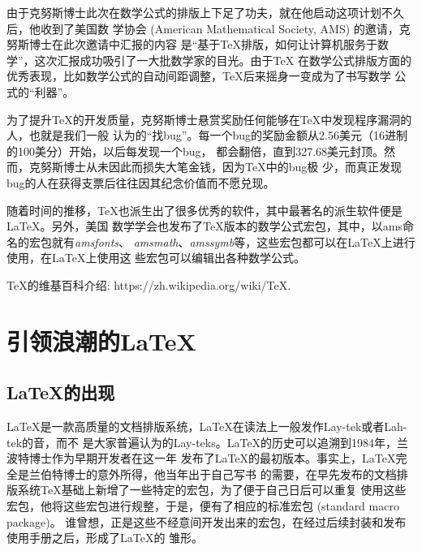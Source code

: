 由于克努斯博士此次在数学公式的排版上下足了功夫，就在他启动这项计划不久后，他收到了美国数
学协会 (American Mathematical Society, AMS) 的邀请，克努斯博士在此次邀请中汇报的内容
是“基于TeX排版，如何让计算机服务于数学”，这次汇报成功吸引了一大批数学家的目光。由于TeX
在数学公式排版方面的优秀表现，比如数学公式的自动间距调整，TeX后来摇身一变成为了书写数学
公式的“利器”。

为了提升TeX的开发质量，克努斯博士悬赏奖励任何能够在TeX中发现程序漏洞的人，也就是我们一般
认为的“找bug”。每一个bug的奖励金额从2.56美元（16进制的100美分）开始，以后每发现一个bug，
都会翻倍，直到327.68美元封顶。然而，克努斯博士从未因此而损失大笔金钱，因为TeX中的bug极
少，而真正发现bug的人在获得支票后往往因其纪念价值而不愿兑现。

随着时间的推移，TeX也派生出了很多优秀的软件，其中最著名的派生软件便是LaTeX。另外，美国
数学学会也发布了TeX版本的数学公式宏包，其中，以ams命名的宏包就有\emph{amsfonts}、
\emph{amsmath}、\emph{amssymb}等，这些宏包都可以在LaTeX上进行使用，在LaTeX上使用这
些宏包可以编辑出各种数学公式。

\begin{tcolorbox}[colback=red!5!white, colframe=red!50!black, title=参考资料]
    TeX的维基百科介绍: https://zh.wikipedia.org/wiki/TeX.
\end{tcolorbox}

\section{引领浪潮的\LaTeX }
\subsection{\LaTeX 的出现}
LaTeX是一款高质量的文档排版系统，LaTeX在读法上一般发作Lay-tek或者Lah-tek的音，而不
是大家普遍认为的Lay-teks。LaTeX的历史可以追溯到1984年，兰波特博士作为早期开发者在这一年
发布了LaTeX的最初版本。事实上，LaTeX完全是兰伯特博士的意外所得，他当年出于自己写书
的需要，在早先发布的文档排版系统TeX基础上新增了一些特定的宏包，为了便于自己日后可以重复
使用这些宏包，他将这些宏包进行规整，于是，便有了相应的标准宏包 (standard macro package)。
谁曾想，正是这些不经意间开发出来的宏包，在经过后续封装和发布使用手册之后，形成了LaTeX的
雏形。

